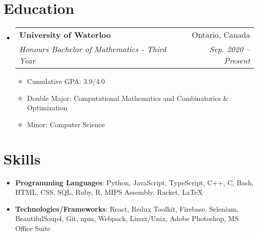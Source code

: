 \documentclass[letterpaper,11pt]{article}
\makeatletter
\newcommand{\resumeSubheading}[4]{
  \vspace{-1pt}\item
    \begin{tabular*}{0.97\textwidth}{l@{\extracolsep{\fill}}r}
      \textbf{#1} & #2 \\
      \textit{\small#3} & \textit{\small #4} \\
    \end{tabular*}\vspace{-5pt}
}
\newcommand{\resumeSubHeadingListStart}{\begin{itemize}[leftmargin=*]}
\newcommand{\resumeSubHeadingListEnd}{\end{itemize}}
\newcommand{\resumeItemListStart}{\begin{itemize}}
\newcommand{\resumeItemListEnd}{\end{itemize}\vspace{-5pt}}
\makeatother
\begin{document}
\section{Education}
  \resumeSubHeadingListStart
    \resumeSubheading
      {University of Waterloo}{Ontario, Canada}
      {Honours Bachelor of Mathematics - Third Year}{Sep. 2020 -- Present}
    \begin{itemize}
        \item Cumulative GPA: 3.9/4.0
        \item Double Major: Computational Mathematics and Combinatorics \& Optimization
        \item Minor: Computer Science
    \end{itemize}
  \resumeSubHeadingListEnd


%
\section{Skills}
 \resumeSubHeadingListStart
   \item{
     \textbf{Programming Languages}{: Python, JavaScript, TypeScript, C++, C, Bash, HTML, CSS, SQL, Ruby, R, MIPS Assembly, Racket, LaTeX}
     \hfill
   }
   \item{
    \textbf{Technologies/Frameworks}{: React, Redux Toolkit, Firebase, Selenium, BeautifulSoup4, Git, npm, Webpack, Linux/Unix, Adobe Photoshop, MS Office Suite}
   }
 \resumeSubHeadingListEnd


\end{document}
